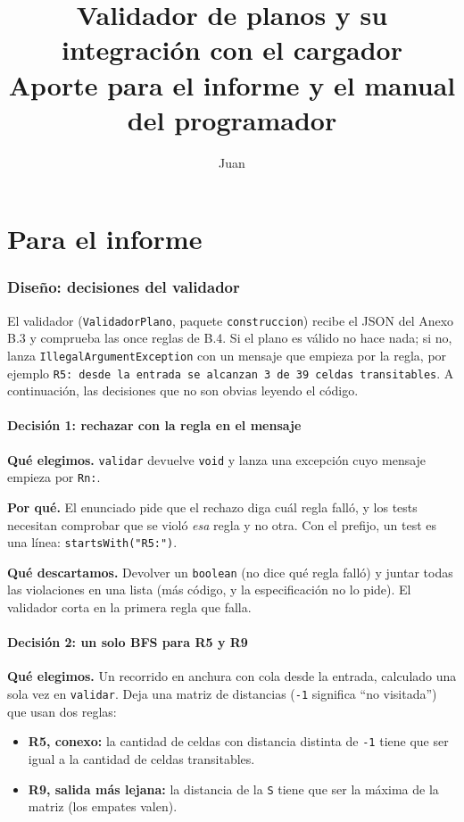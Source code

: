 \documentclass[11pt,a4paper]{article}
\title{Validador de planos y su integraci\'on con el cargador\\
\large Aporte para el informe y el manual del programador}
\author{Juan}
\date{}
\begin{document}
\maketitle
\tableofcontents

\part{Para el informe}

\section{Dise\~no: decisiones del validador}

El validador (\texttt{ValidadorPlano}, paquete \texttt{construccion}) recibe el
JSON del Anexo B.3 y comprueba las once reglas de B.4. Si el plano es v\'alido
no hace nada; si no, lanza \texttt{IllegalArgumentException} con un mensaje que
empieza por la regla, por ejemplo \texttt{R5: desde la entrada se alcanzan 3 de
39 celdas transitables}. A continuaci\'on, las decisiones que no son obvias
leyendo el c\'odigo.

\subsection*{Decisi\'on 1: rechazar con la regla en el mensaje}

\textbf{Qu\'e elegimos.} \texttt{validar} devuelve \texttt{void} y lanza una
excepci\'on cuyo mensaje empieza por \texttt{Rn:}.

\textbf{Por qu\'e.} El enunciado pide que el rechazo diga cu\'al regla fall\'o, y
los tests necesitan comprobar que se viol\'o \emph{esa} regla y no otra. Con el
prefijo, un test es una l\'inea: \texttt{startsWith("R5:")}.

\textbf{Qu\'e descartamos.} Devolver un \texttt{boolean} (no dice qu\'e regla
fall\'o) y juntar todas las violaciones en una lista (m\'as c\'odigo, y la
especificaci\'on no lo pide). El validador corta en la primera regla que falla.

\subsection*{Decisi\'on 2: un solo BFS para R5 y R9}

\textbf{Qu\'e elegimos.} Un recorrido en anchura con cola desde la entrada,
calculado una sola vez en \texttt{validar}. Deja una matriz de distancias
(\texttt{-1} significa ``no visitada'') que usan dos reglas:
\begin{itemize}[nosep]
  \item \textbf{R5, conexo:} la cantidad de celdas con distancia distinta de
        \texttt{-1} tiene que ser igual a la cantidad de celdas transitables.
  \item \textbf{R9, salida m\'as lejana:} la distancia de la \texttt{S} tiene
        que ser la m\'axima de la matriz (los empates valen).
\end{itemize}
\end{document}
